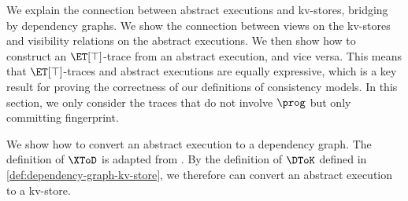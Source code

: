 We explain the connection between abstract executions and kv-stores,
bridging by dependency graphs.
We show the connection between views on the kv-stores
and visibility relations on the abstract executions.
We then show how to construct an \( \ET[\top] \)-trace from an abstract execution, and vice versa.
This means that \( \ET[\top] \)-traces and abstract executions are equally expressive,
which is a key result for proving the correctness of our definitions of consistency models.
In this section, we only consider the traces that do not involve \( \prog \) but only committing fingerprint.


We show how to convert an abstract execution to a dependency graph.
The definition of \( \XToD \) is adapted from \citep{framework-concur,SIanalysis}.
By the definition of \( \DToK \) defined in \cref{def:dependency-graph-kv-store},
we therefore can convert an abstract execution to a kv-store.


